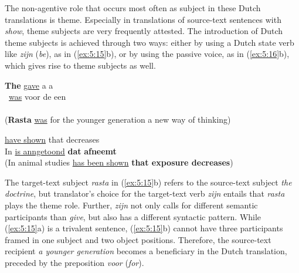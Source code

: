 \documentclass[output=paper]{LSP/langsci}
\begin{document}
 
The non-agentive role that occurs most often as subject in these Dutch translations is theme. Especially in translations of source-text sentences with \textit{show}, theme subjects are very frequently attested. The introduction of Dutch theme subjects is achieved through two ways: either by using a Dutch state verb like \textit{zijn} (\textit{be}), as in (\ref{ex:5:15}b), or by using the passive voice, as in (\ref{ex:5:16}b), which gives rise to theme subjects as well.

\newpage

\ea \label{ex:5:15} 
\ea
\textbf{The}  \ul{gave} a  a\\\, 
\ex {} \ul{was} voor de  een\\\, \\[1em]
(\textbf{Rasta} \ul{was} for the younger generation a new way of thinking)
\z
\z


\ea \label{ex:5:16}
\ea {} \ul{have shown} that  decreases\\[1em]
\ex
In  \ul{is anngetoond} \textbf{dat}  \textbf{afneemt}\\
(In animal studies \ul{has been shown} \textbf{that exposure decreases})
\z
\z



The target-text subject \textit{rasta} in (\ref{ex:5:15}b) refers to the source-text subject \textit{the doctrine}, but translator’s choice for the target-text verb \textit{zijn} entails that \textit{rasta} plays the theme role. Further, \textit{zijn} not only calls for different semantic participants than \textit{give}, but also has a different syntactic pattern. While (\ref{ex:5:15}a) is a trivalent sentence, (\ref{ex:5:15}b) cannot have three participants framed in one subject and two object positions. Therefore, the source-text recipient \textit{a younger generation} becomes a beneficiary in the Dutch translation, preceded by the preposition \textit{voor} (\textit{for}).
\end{document}
